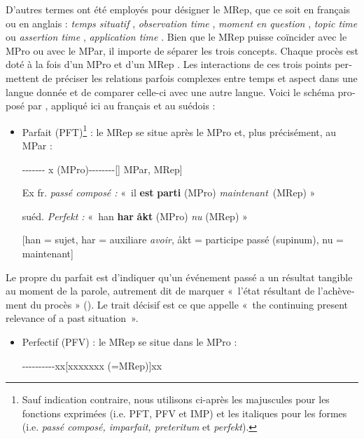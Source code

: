 \documentclass[french, output=paper]{langscibook}
\begin{document}
\begin{otherlanguage}{french}
D’autres termes ont été employés pour désigner le MRep, que ce soit en français ou en anglais : \textit{temps situatif} \citep{François1984}, \textit{observation time} \citep{Dahl1985}, \textit{moment en question} \citep{Noyau1991}, \textit{topic time} ou \textit{assertion time} \citep{Klein1994}, \textit{application time} \citep{Harder1996}. Bien que le MRep puisse coïncider avec le MPro ou avec le MPar, il importe de séparer les trois concepts. Chaque procès est doté à la fois d’un MPro et d’un MRep \citep{Noyau1997}. Les interactions de ces trois points permettent de préciser les relations parfois complexes entre temps et aspect dans une langue donnée et de comparer celle-ci avec une autre langue. Voici le schéma proposé par \citet{Klein1994}, appliqué ici au français et au suédois :


\begin{itemize}
\item
Parfait (PFT)\footnote{Sauf indication contraire, nous utilisons ci-après les majuscules pour les fonctions exprimées (i.e. PFT, PFV et IMP) et les italiques pour les formes (i.e. \textit{passé composé, imparfait, preteritum} et \textit{perfekt}).} : le MRep se situe après le MPro et, plus précisément, au MPar :

{}-{}-{}-{}-{}-{}-{}- x (MPro)-{}-{}-{}-{}-{}-{}-{}-[] MPar, MRep]



Ex fr. \textit{passé composé :} «~il \textbf{est} \textbf{parti} (MPro) \textit{maintenant}~(MRep) »



suéd. \textit{Perfekt :} «\textit{~}han \textbf{har} \textbf{åkt} (MPro) \textit{nu} (MRep) » 



[han = sujet, har = auxiliare \textit{avoir}, åkt = participe passé (supinum), nu = maintenant]
\end{itemize}


Le propre du parfait est d’indiquer qu’un événement passé a un résultat tangible au moment de la parole, autrement dit de marquer «~l’état résultant de l’achèvement du procès » (\citealt[302]{RiegelEtAl1994}). Le trait décisif est ce que \citet[56]{Comrie1976} appelle «~the continuing present relevance of a past situation~».


\begin{itemize}
\item 
Perfectif  (PFV)  :  le MRep se situe dans le MPro : 

-{}-{}-{}-{}-{}-{}-{}-{}-{}-xx[xxxxxxx (=MRep)]xx




\end{itemize}
\end{otherlanguage}
\end{document}
